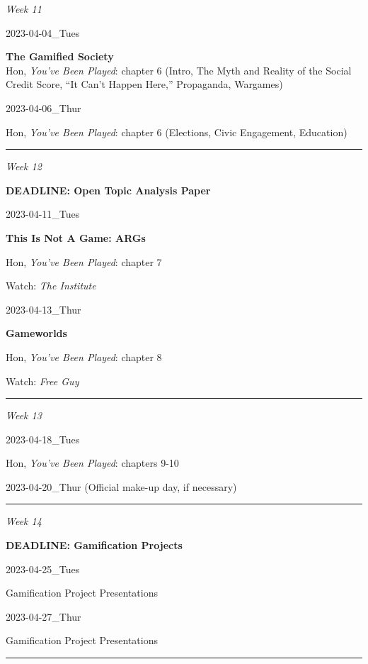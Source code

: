 \documentclass[
  letterpaper,
  DIV=11,
  numbers=noendperiod]{scrartcl}
\begin{document}
\emph{Week 11}

2023-04-04\_Tues

\textbf{The Gamified Society}\\
Hon, \emph{You've Been Played}: chapter 6 (Intro, The Myth and Reality
of the Social Credit Score, ``It Can't Happen Here,'' Propaganda,
Wargames)

2023-04-06\_Thur

Hon, \emph{You've Been Played}: chapter 6 (Elections, Civic Engagement,
Education)

\begin{center}\rule{0.5\linewidth}{0.5pt}\end{center}

\emph{Week 12}

\textbf{DEADLINE: Open Topic Analysis Paper}

2023-04-11\_Tues

\textbf{This Is Not A Game: ARGs}

Hon, \emph{You've Been Played}: chapter 7

Watch: \emph{The Institute}

2023-04-13\_Thur

\textbf{Gameworlds}

Hon, \emph{You've Been Played}: chapter 8

Watch: \emph{Free Guy}

\begin{center}\rule{0.5\linewidth}{0.5pt}\end{center}

\emph{Week 13}

2023-04-18\_Tues

Hon, \emph{You've Been Played}: chapters 9-10

2023-04-20\_Thur (Official make-up day, if necessary)

\begin{center}\rule{0.5\linewidth}{0.5pt}\end{center}

\emph{Week 14}

\textbf{DEADLINE: Gamification Projects}

2023-04-25\_Tues

Gamification Project Presentations

2023-04-27\_Thur

Gamification Project Presentations

\begin{center}\rule{0.5\linewidth}{0.5pt}\end{center}
\end{document}
